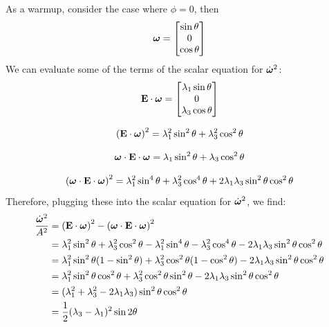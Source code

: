 \documentclass[extra,mreferee]{gji}
\begin{document}
As a warmup, consider the case where $\phi = 0$, then  
\begin{equation}
\mitbf{\omega} = 
\begin{bmatrix}
\sin{\theta}  \\
0 \\
\cos{\theta} \\
\end{bmatrix}
\end{equation}
We can evaluate some of the terms of the scalar equation for $\dot{\mitbf{\omega}}^2$:
\begin{equation}
\mathbf{E}\cdot \mitbf{\omega} = 
\begin{bmatrix}
\lambda_1 \sin{\theta} \\
0 \\
\lambda_3 \cos{\theta}
\end{bmatrix}
\end{equation}

\begin{equation}
\left(\mathbf{E}\cdot \mitbf{\omega}\right)^2 = \lambda_1^2 \sin^2{\theta} + \lambda_3^2 \cos^2{\theta}
\end{equation}

\begin{equation}
\mitbf{\omega} \cdot \mathbf{E} \cdot \mitbf{\omega} = 
\lambda_1 \sin^2{\theta} + \lambda_3 \cos^2{\theta}
\end{equation}

\begin{equation}
\left(\mitbf{\omega} \cdot \mathbf{E} \cdot \mitbf{\omega} \right)^2 =  
\lambda_1^2 \sin^4{\theta} + \lambda_3^2 \cos^4{\theta} + 2 \lambda_1 \lambda_3 \sin^2{\theta} \cos^2{\theta}
\end{equation}
Therefore, plugging these into the scalar equation for $\dot{\mitbf{\omega}}^2$, we find:
\begin{equation}
\begin{aligned}
\frac{\dot{\mitbf{\omega}}^2}{A^2}  &= 
 \left(\mathbf{E}\cdot \mitbf{\omega}\right)^2
 - \left(\mitbf{\omega} \cdot \mathbf{E} \cdot \mitbf{\omega} \right)^2  \\
 &= \lambda_1^2 \sin^2{\theta} + \lambda_3^2 \cos^2{\theta}
 - \lambda_1^2 \sin^4{\theta} - \lambda_3^2 \cos^4{\theta} - 2 \lambda_1 \lambda_3 \sin^2{\theta} \cos^2{\theta} \\
 &= \lambda_1^2 \sin^2{\theta} (1 - \sin^2{\theta}) + \lambda_3^2 \cos^2{\theta} (1 - \cos^2{\theta})
  - 2 \lambda_1 \lambda_3 \sin^2{\theta} \cos^2{\theta} \\
 &= \lambda_1^2 \sin^2{\theta} \cos^2{\theta} + \lambda_3^2 \cos^2{\theta} \sin^2{\theta}
  - 2 \lambda_1 \lambda_3 \sin^2{\theta} \cos^2{\theta} \\
 &= (\lambda_1^2 + \lambda_3^2 - 2 \lambda_1 \lambda_3) \sin^2{\theta} \cos^2{\theta} \\
 &= \frac{1}{2} (\lambda_3 - \lambda_1)^2 \sin{2 \theta} \\
\end{aligned}
\end{equation}
\end{document}
